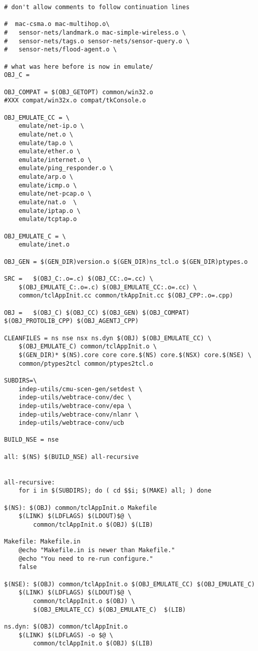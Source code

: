 \begin{verbatim}
# don't allow comments to follow continuation lines

#  mac-csma.o mac-multihop.o\
#	sensor-nets/landmark.o mac-simple-wireless.o \
#	sensor-nets/tags.o sensor-nets/sensor-query.o \
#	sensor-nets/flood-agent.o \

# what was here before is now in emulate/
OBJ_C =

OBJ_COMPAT = $(OBJ_GETOPT) common/win32.o
#XXX compat/win32x.o compat/tkConsole.o

OBJ_EMULATE_CC = \
	emulate/net-ip.o \
	emulate/net.o \
	emulate/tap.o \
	emulate/ether.o \
	emulate/internet.o \
	emulate/ping_responder.o \
	emulate/arp.o \
	emulate/icmp.o \
	emulate/net-pcap.o \
	emulate/nat.o  \
	emulate/iptap.o \
	emulate/tcptap.o

OBJ_EMULATE_C = \
	emulate/inet.o

OBJ_GEN = $(GEN_DIR)version.o $(GEN_DIR)ns_tcl.o $(GEN_DIR)ptypes.o

SRC =	$(OBJ_C:.o=.c) $(OBJ_CC:.o=.cc) \
	$(OBJ_EMULATE_C:.o=.c) $(OBJ_EMULATE_CC:.o=.cc) \
	common/tclAppInit.cc common/tkAppInit.cc $(OBJ_CPP:.o=.cpp)

OBJ =	$(OBJ_C) $(OBJ_CC) $(OBJ_GEN) $(OBJ_COMPAT) $(OBJ_PROTOLIB_CPP) $(OBJ_AGENTJ_CPP)

CLEANFILES = ns nse nsx ns.dyn $(OBJ) $(OBJ_EMULATE_CC) \
	$(OBJ_EMULATE_C) common/tclAppInit.o \
	$(GEN_DIR)* $(NS).core core core.$(NS) core.$(NSX) core.$(NSE) \
	common/ptypes2tcl common/ptypes2tcl.o 

SUBDIRS=\
	indep-utils/cmu-scen-gen/setdest \
	indep-utils/webtrace-conv/dec \
	indep-utils/webtrace-conv/epa \
	indep-utils/webtrace-conv/nlanr \
	indep-utils/webtrace-conv/ucb

BUILD_NSE = nse

all: $(NS) $(BUILD_NSE) all-recursive


all-recursive:
	for i in $(SUBDIRS); do ( cd $$i; $(MAKE) all; ) done

$(NS): $(OBJ) common/tclAppInit.o Makefile
	$(LINK) $(LDFLAGS) $(LDOUT)$@ \
		common/tclAppInit.o $(OBJ) $(LIB)

Makefile: Makefile.in
	@echo "Makefile.in is newer than Makefile."
	@echo "You need to re-run configure."
	false

$(NSE): $(OBJ) common/tclAppInit.o $(OBJ_EMULATE_CC) $(OBJ_EMULATE_C)
	$(LINK) $(LDFLAGS) $(LDOUT)$@ \
		common/tclAppInit.o $(OBJ) \
		$(OBJ_EMULATE_CC) $(OBJ_EMULATE_C)  $(LIB) 

ns.dyn: $(OBJ) common/tclAppInit.o
	$(LINK) $(LDFLAGS) -o $@ \
		common/tclAppInit.o $(OBJ) $(LIB)


\end{verbatim}
